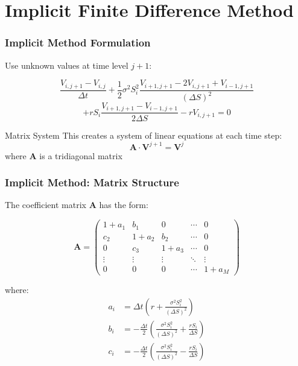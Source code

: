 \documentclass{beamer}
\begin{document}
\section{Implicit Finite Difference Method}

\begin{frame}
\frametitle{Implicit Method Formulation}
Use unknown values at time level $j+1$:

$$\frac{V_{i,j+1} - V_{i,j}}{\Delta t} + \frac{1}{2}\sigma^2 S_i^2 \frac{V_{i+1,j+1} - 2V_{i,j+1} + V_{i-1,j+1}}{(\Delta S)^2}$$
$$+ rS_i \frac{V_{i+1,j+1} - V_{i-1,j+1}}{2\Delta S} - rV_{i,j+1} = 0$$

\begin{block}{Matrix System}
This creates a system of linear equations at each time step:
$$\mathbf{A} \cdot \mathbf{V}^{j+1} = \mathbf{V}^j$$
where $\mathbf{A}$ is a tridiagonal matrix
\end{block}
\end{frame}

\begin{frame}
\frametitle{Implicit Method: Matrix Structure}
The coefficient matrix \(\mathbf{A}\) has the form:

\[\mathbf{A} = \begin{pmatrix}
1+a_1 & b_1 & 0 & \cdots & 0 \\
c_2 & 1+a_2 & b_2 & \cdots & 0 \\
0 & c_3 & 1+a_3 & \cdots & 0 \\
\vdots & \vdots & \vdots & \ddots & \vdots \\
0 & 0 & 0 & \cdots & 1+a_M
\end{pmatrix}\]

where:
\begin{align}
a_i &= \Delta t \left( r + \frac{\sigma^2 S_i^2}{(\Delta S)^2} \right) \\
b_i &= -\frac{\Delta t}{2} \left( \frac{\sigma^2 S_i^2}{(\Delta S)^2} + \frac{rS_i}{\Delta S} \right) \\
c_i &= -\frac{\Delta t}{2} \left( \frac{\sigma^2 S_i^2}{(\Delta S)^2} - \frac{rS_i}{\Delta S} \right)
\end{align}
\end{frame}
\end{document}
